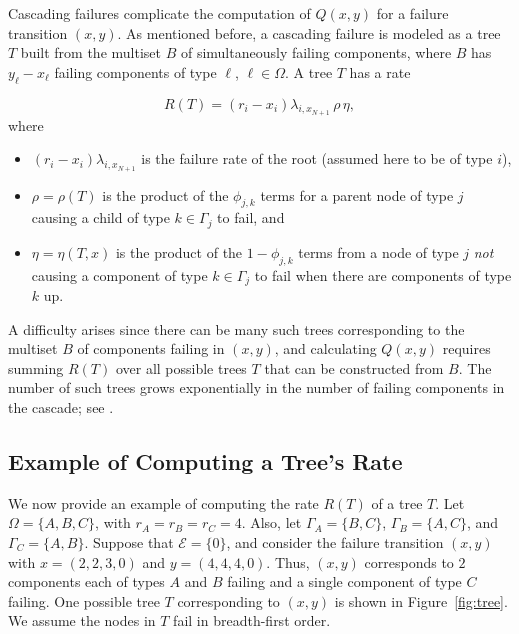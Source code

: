 \documentclass[12pt]{article}
\begin{document}
Cascading failures complicate the computation of $Q(x, y)$ for a failure transition $(x, y)$. As mentioned before, a cascading failure is modeled as a tree $T$ built from the multiset $B$ of simultaneously failing components, where $B$ has $y_\ell - x_\ell$ failing components of type $\ell$, $\ell \in \Omega$. A tree $T$ has a rate

\begin{equation}
\label{eq:rate}
R(T) = (r_i - x_i) \lambda_{i,x_{N + 1}} \, \rho \, \eta,
\end{equation}
where
\begin{itemize}
\item $(r_i - x_i) \lambda_{i,x_{N + 1}}$ is the failure rate of the root (assumed here to be of type $i$),
\item $\rho = \rho(T)$ is the product of the
$\phi_{j, k}$ terms for a parent node of type $j$ causing a child of type $k \in \Gamma_j$ to fail, and
\item $\eta = \eta(T,x)$ is the product of the $1 - \phi_{j, k}$ terms from a node of type $j$ \textit{not} causing a component of type $k \in \Gamma_j$ to fail when there are components of type $k$ up.
\end{itemize}

A difficulty arises since there can be many such trees corresponding to the multiset $B$ of components failing in $(x, y)$, and calculating $Q(x, y)$ requires summing $R(T)$ over all possible trees $T$ that can be constructed from $B$. The number of such trees grows exponentially in the number of failing components in the cascade; see \cite{ING:2009}.

\subsection{Example of Computing a Tree's Rate}
\label{sec:exrate}

We now provide an example of computing the rate $R(T)$ of a tree $T$. Let $\Omega = \{ A, B, C \}$, with $r_A = r_B = r_C = 4$. Also, let $\Gamma_A = \{ B, C \}$, $\Gamma_B = \{ A, C \}$, and $\Gamma_C = \{ A, B \}$. Suppose that $\mathcal{E} = \{ 0 \}$, and consider the failure transition $(x, y)$ with $x = (2, 2, 3, 0)$ and $y = (4, 4, 4, 0)$. Thus, $(x, y)$ corresponds to $2$ components each of types $A$ and $B$ failing and a single component of type $C$ failing. One possible tree $T$ corresponding to $(x, y)$ is shown in Figure~\ref{fig:tree}.
We assume the nodes in $T$ fail in breadth-first order.
\end{document}
